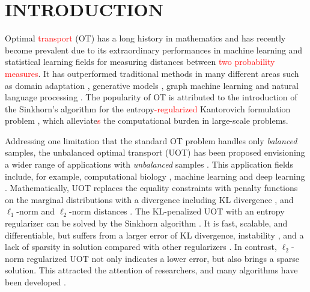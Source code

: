\documentclass[twoside]{article}
\theoremstyle{plain}
\newcommand{\changeHK}[1]{\textcolor{red}{#1}}
\begin{document}
\section{INTRODUCTION}
\label{sec:int}
Optimal \changeHK{transport} (OT) has a long history in mathematics and has recently become prevalent due to its extraordinary performances in machine learning and statistical learning fields for measuring distances between \changeHK{two probability measures}. It has outperformed traditional methods in many different areas such as domain adaptation \citep{7586038}, generative models \citep{arjovsky2017wasserstein}, graph machine learning \citep{Maretic_NIPS_2019} and natural language processing \citep{084adf2f555549c493e0331a00e4ecad}. The popularity of OT is attributed to the introduction of the Sinkhorn's algorithm \citep{10.2307/2040061} for the entropy\changeHK{-regularized} Kantorovich formulation problem \citep{NIPS2013_af21d0c9}, which alleviate\changeHK{s} the computational burden in large-scale problems. 

Addressing one limitation that the standard OT problem handles only {\it balanced} samples, the unbalanced optimal transport (UOT) has been proposed envisioning a wider range of applications with {\it unbalanced} samples \citep{Caffarelli_AM_2010,chizat2017scaling}. This application fields include, for example, computational biology \citep{SCHIEBINGER2019928}, machine learning \citep{Janati_AISTATS_2019} and deep learning \citep{Yang_ICLR_2019}. Mathematically, UOT replaces the equality constraints with penalty functions on the marginal distributions with a divergence including KL divergence \citep{Liero:2018wo}, and $\ell_1$-norm \citep{Caffarelli_AM_2010} and $\ell_2$-norm distances \citep{refId0}. The KL-penalized UOT with an entropy regularizer can be solved by the Sinkhorn algorithm \citep{UOTSinkhorn2020}. It is fast, scalable, and differentiable, but suffers from a larger error of KL divergence, instability \citep{DBLP:journals/corr/Schmitzer16}, and a lack of sparsity in solution compared with other regularizers \citep{Blondel_AISTATS_2018}. In contrast, $\ell_2$-norm regularized UOT not only indicates a lower error, but also brings a sparse solution. This attracted the attention of researchers, and many algorithms have been developed \citep{Blondel_AISTATS_2018, Nguyen_arXiv_2022}.
\end{document}

